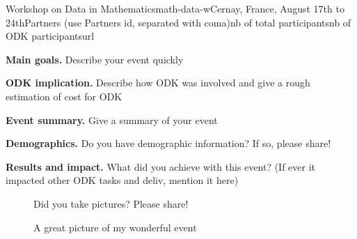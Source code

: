 \begin{event}{Workshop on Data in Mathematics}{math-data-w}{Cernay, France, August 17th to 24th}{Partners (use Partners id, separated with coma)}{nb of total participants}{nb of ODK participants}{url}

\textbf{Main goals.} Describe your event quickly

\textbf{ODK implication.} Describe how ODK was involved and give a rough estimation of cost for ODK

\textbf{Event summary.} Give a summary of your event

\textbf{Demographics.} Do you have demographic information? If so, please share!

\textbf{Results and impact.} What did you achieve with this event? (If ever it impacted 
other ODK tasks and deliv, mention it here)

\begin{figure}[ht]
\caption*{A great picture of my wonderful event}
Did you take pictures? Please share!
\end{figure}



\end{event}
